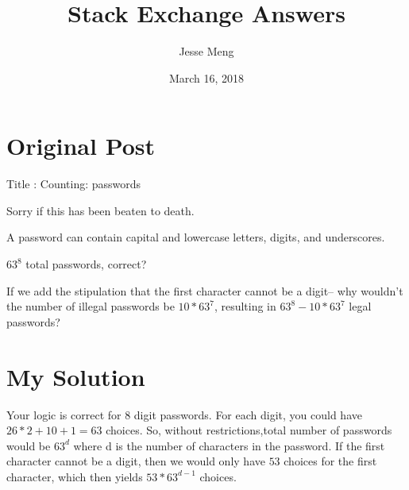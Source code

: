 \documentclass{article}
\title{Stack Exchange Answers}
\author{Jesse Meng }
\date{March 16, 2018}
\begin{document}
\maketitle

\section{Original Post}
Title : Counting: passwords

Sorry if this has been beaten to death. 

A password can contain capital and lowercase letters, digits, and underscores.

$63^8$ total passwords, correct?


If we add the stipulation that the first character cannot be a digit-- why wouldn't the number of illegal passwords be $10*63^7$, resulting in $63^8-10*63^7$ legal passwords? 
\section{My Solution}
Your logic is correct for 8 digit passwords. For each digit, you could have $26*2+10+1=63$ choices. So, without restrictions,total number of passwords would be $63^d$ where d is the number of characters in the password. If the first character cannot be a digit, then we would only have $53$ choices for the first character, which then yields $53*63^{d-1}$ choices.
\end{document}

